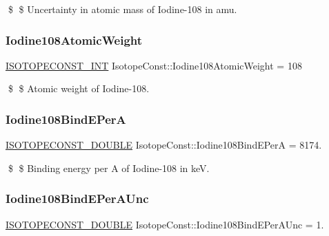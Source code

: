 \$ \$ Uncertainty in atomic mass of Iodine-\/108 in amu. \mbox{\label{group___isotope_const-_iodine-_i108_ga70541b1f68d9ae1ffef23491f31583a0}} 
\subsubsection{\texorpdfstring{Iodine108\+Atomic\+Weight}{Iodine108AtomicWeight}}
{\footnotesize\ttfamily \mbox{\hyperlink{group___isotope_const-_macros_ga5f18360b3e99483a35c32d789e62621c}{I\+S\+O\+T\+O\+P\+E\+C\+O\+N\+S\+T\+\_\+\+I\+NT}} Isotope\+Const\+::\+Iodine108\+Atomic\+Weight = 108}

\$ \$ Atomic weight of Iodine-\/108. \mbox{\label{group___isotope_const-_iodine-_i108_ga160be1b6bb73e62bec1ad9a1eed0c031}} 
\subsubsection{\texorpdfstring{Iodine108\+Bind\+E\+PerA}{Iodine108BindEPerA}}
{\footnotesize\ttfamily \mbox{\hyperlink{group___isotope_const-_macros_ga8f45a7272ce02c0b4c65c44636ed719a}{I\+S\+O\+T\+O\+P\+E\+C\+O\+N\+S\+T\+\_\+\+D\+O\+U\+B\+LE}} Isotope\+Const\+::\+Iodine108\+Bind\+E\+PerA = 8174.}

\$ \$ Binding energy per A of Iodine-\/108 in keV. \mbox{\label{group___isotope_const-_iodine-_i108_ga272d0b883b889d75256c03a73b55c147}} 
\subsubsection{\texorpdfstring{Iodine108\+Bind\+E\+Per\+A\+Unc}{Iodine108BindEPerAUnc}}
{\footnotesize\ttfamily \mbox{\hyperlink{group___isotope_const-_macros_ga8f45a7272ce02c0b4c65c44636ed719a}{I\+S\+O\+T\+O\+P\+E\+C\+O\+N\+S\+T\+\_\+\+D\+O\+U\+B\+LE}} Isotope\+Const\+::\+Iodine108\+Bind\+E\+Per\+A\+Unc = 1.}

